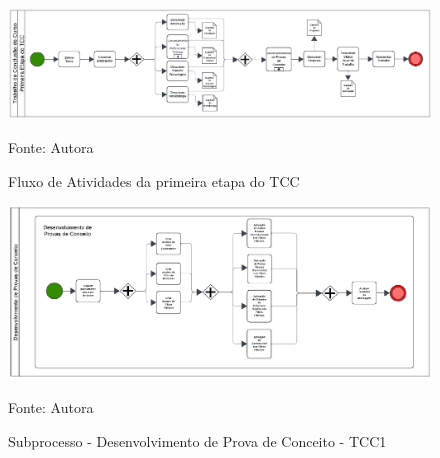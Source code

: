 \begin{figure}[htbp]
    \centering
    \caption{Fluxo de Atividades da primeira etapa do TCC}
    \label{fig:bpmnTcc1}
    
    \vspace{2pt} %
    
    \includegraphics[width=1.0\textwidth]{figuras/bpmnTcc1.eps}
    
    \vspace{2pt} %
    
    \small Fonte: Autora
\end{figure}

\begin{figure}[htbp]
    \centering
    \caption{Subprocesso - Desenvolvimento de Prova de Conceito - TCC1}
    \label{fig:subproccesspoc}
    
    \vspace{2pt} %
    
    \includegraphics[width=1.0\textwidth]{figuras/subproccesspoc.eps}
    
    \vspace{2pt} %
    
    \small Fonte: Autora
\end{figure}

